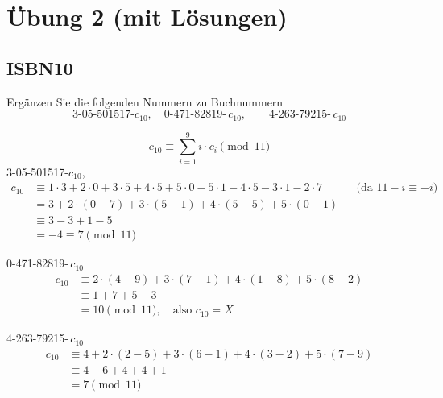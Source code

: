 \section{Übung 2 (mit Lösungen)}
\subsection{ISBN10}

\begin{aufgabe}[Aufgabe 1]
Ergänzen Sie die folgenden Nummern zu Buchnummern
\[
\text{3-05-501517-}c_{10},\quad \text{0-471-82819-}\,c_{10},\qquad \text{4-263-79215-}\,c_{10}
\]
\end{aufgabe}
\begin{loesung}
\[
c_{10} \equiv \sum_{i=1}^{9} i \cdot c_i \pmod{11}
\]
3-05-501517-$c_{10}$,
\begin{align*}
c_{10} &\equiv 1 \cdot 3 + 2 \cdot 0 + 3 \cdot 5 + 4 \cdot 5 + 5 \cdot 0 - 5 \cdot 1 - 4 \cdot 5 - 3 \cdot 1 - 2 \cdot 7 && \text{(da } 11 - i \equiv -i\text{)}\\
&= 3 + 2 \cdot (0-7) + 3 \cdot (5-1) + 4 \cdot (5-5) + 5 \cdot (0-1)\\
&\equiv 3 - 3 + 1 - 5\\
&= -4 \equiv 7 \pmod{11}
\end{align*}

0-471-82819-\,$c_{10}$
\begin{align*}
c_{10} &\equiv 2 \cdot (4-9) + 3 \cdot (7-1) + 4 \cdot (1-8) + 5 \cdot (8-2)\\
&\equiv 1 + 7 + 5 - 3\\
&= 10 \pmod{11}, \quad \text{also } c_{10} = X
\end{align*}

4-263-79215-\,$c_{10}$
\begin{align*}
c_{10} &\equiv 4 + 2 \cdot (2-5) + 3 \cdot (6-1) + 4 \cdot (3-2) + 5 \cdot (7-9)\\
&\equiv 4 - 6 + 4 + 4 + 1\\
&= 7 \pmod{11}
\end{align*}
\end{loesung}

